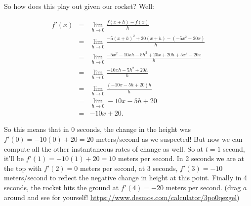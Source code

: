 \documentclass[10pt]{article}
\theoremstyle{definition}
\newcommand{\limit}[2]{\displaystyle{ \lim_{#1 \to #2}}}
\begin{document}
So how does this play out given our rocket?  Well:

\begin{eqnarray*}
f'(x)&=&\limit{h}{0}\frac{f(x+h)-f(x)}{h}\\
&=&\limit{h}{0} \frac{-5(x+h)^2+20(x+h)-(-5x^2+20x)}{h}\\
&=&\limit{h}{0}\frac{-5x^2-10xh-5h^2+20x+20h+5x^2-20x}{h}\\
&=&\limit{h}{0}\frac{-10xh-5h^2+20h}{h}\\
&=&\limit{h}{0}\frac{(-10x-5h+20)h}{h}\\
&=&\limit{h}{0} -10x-5h+20\\
&=&-10x+20.
\end{eqnarray*}


So this means that in $0$ seconds, the change in the height was $f'(0)=-10(0)+20=20$ meters/second as we suspected!  But now we can compute all the other instantaneous rates of change as well.  So at $t=1$ second, it'll be $f'(1)=-10(1)+20=10$ meters per second.  In 2 seconds we are at the top with $f'(2)=0$ meters per second, at 3 seconds, $f'(3)=-10$ meters/second to reflect the negative change in height at this point.  Finally in 4 seconds, the rocket hits the ground at $f'(4)=-20$ meters per second.  (drag $a$ around and see for yourself! \url{https://www.desmos.com/calculator/3po0qezgel})
\end{document}
